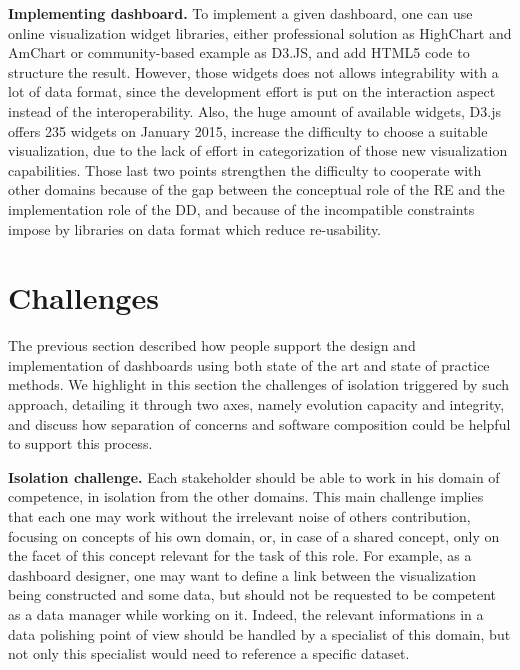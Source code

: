 \documentclass{acm_proc_article-sp}
\begin{document}
\textbf{Implementing dashboard.}
To implement a given dashboard, one can use online visualization widget
libraries, either professional solution as HighChart and AmChart or
community-based example as D3.JS, and add HTML5 code to structure the
result.
However, those widgets does not allows integrability with a lot of data format,
since the development effort is put on the interaction aspect
instead of the interoperability.
Also, the huge amount of available widgets, \eg D3.js offers 235 widgets on
January 2015, increase the difficulty to choose a suitable visualization,
due to the lack of effort in categorization of those new visualization
capabilities\cite{ecmfa}.
Those last two points strengthen the difficulty to cooperate with other domains
because of the gap between the conceptual role of the RE and the implementation
role of the DD, and because of the incompatible constraints impose by libraries
on data format which reduce re-usability.

\section{Challenges}

The previous section described how people support the design and
implementation of dashboards using both state of the art and state of
practice methods. We highlight in this section the challenges of isolation
triggered by such approach, detailing it through two axes, namely evolution
capacity and integrity, and discuss how separation of concerns and
software composition could be helpful to support this process.


\textbf{Isolation challenge.}
Each stakeholder should be able to work in his domain of competence,
in isolation from the other domains. This main challenge implies that
each one may work without the irrelevant noise of others contribution,
focusing on concepts of his own domain, or, in case of a shared concept,
only on the facet of this concept relevant for the task of this role.
For example, as a dashboard designer, one may want to define a link
between the visualization being constructed and some data, but should
not be requested to be competent as a data manager while working on it.
Indeed, the relevant informations in a data polishing point of view should
be handled by a specialist of this domain, but not only this specialist
would need to reference a specific dataset.
\end{document}

